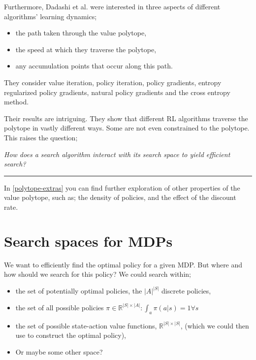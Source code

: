 Furthermore, Dadashi et al. \cite{Dadashi2018} were interested in three aspects of different algorithms’ learning dynamics;

\begin{itemize}
\tightlist
  \item the path taken through the value polytope,
  \item the speed at which they traverse the polytope,
  \item any accumulation points that occur along this path.
\end{itemize}


They consider value iteration, policy iteration, policy gradients, entropy regularized policy gradients,
natural policy gradients and the cross entropy method.

Their results are intriguing. They show that different RL algorithms traverse the polytope in vastly different ways.
Some are not even constrained to the polytope. This raises the question;

\begin{displayquote}
  \textsl{How does a search algorithm interact with its search space to yield efficient search?}
\end{displayquote}

\begin{center}\rule{0.5\linewidth}{\linethickness}\end{center}

In \ref{polytope-extras} you can find further exploration of other properties of
the value polytope, such as; the density of policies, and the effect of the discount
rate.

\newpage
\section{Search spaces for MDPs}\label{search-spaces-mdps}

We want to efficiently find the optimal policy for a given MDP. But where and how should we
search for this policy? We could search within;

\begin{itemize}
\tightlist
  \item the set of potentially optimal policies, the $|A|^{|S|}$ discrete policies,
  \item the set of all possible policies $\pi \in \mathbb R^{|S| \times |A|}: \int_a \pi(a|s) = 1 \forall s $
  \item the set of possible state-action value functions, $\mathbb R^{|S|\times|S|}$,
  (which we could then use to construct the optimal policy),
  \item Or maybe some other space?
\end{itemize}

